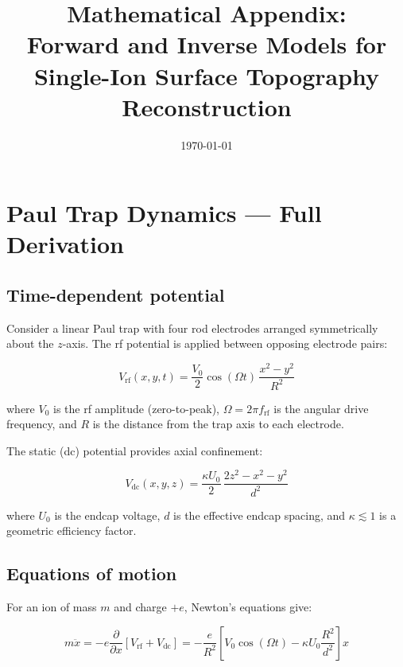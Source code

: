\documentclass[11pt,a4paper]{article}
\title{Mathematical Appendix:\\ Forward and Inverse Models for Single-Ion Surface Topography Reconstruction}
\date{\today}
\author{}
\begin{document}
\maketitle

\section{Paul Trap Dynamics — Full Derivation}

\subsection{Time-dependent potential}

Consider a linear Paul trap with four rod electrodes arranged symmetrically about
the $z$-axis. The rf potential is applied between opposing electrode pairs:

\begin{equation}
V_{\text{rf}}(x,y,t) = \frac{V_0}{2}\cos(\Omega t)\,\frac{x^2 - y^2}{R^2}
\label{eq:rf_potential}
\end{equation}

where $V_0$ is the rf amplitude (zero-to-peak), $\Omega = 2\pi f_{\text{rf}}$ is the
angular drive frequency, and $R$ is the distance from the trap axis to each electrode.

The static (dc) potential provides axial confinement:

\begin{equation}
V_{\text{dc}}(x,y,z) = \frac{\kappa U_0}{2}\,\frac{2z^2 - x^2 - y^2}{d^2}
\label{eq:dc_potential}
\end{equation}

where $U_0$ is the endcap voltage, $d$ is the effective endcap spacing, and
$\kappa \lesssim 1$ is a geometric efficiency factor.

\subsection{Equations of motion}

For an ion of mass $m$ and charge $+e$, Newton's equations give:

\begin{equation}
m\ddot{x} = -e\frac{\partial}{\partial x}[V_{\text{rf}} + V_{\text{dc}}]
           = -\frac{e}{R^2}\left[V_0\cos(\Omega t) - \kappa U_0\frac{R^2}{d^2}\right]x
\label{eq:eom_x}
\end{equation}
\end{document}
